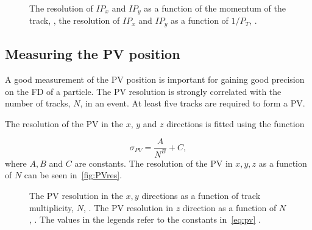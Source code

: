 \begin{figure}
  \centering
  \caption{The resolution of $IP_{x}$ and $IP_{y}$ as a function of the momentum of the track, \protect{}, the resolution of $IP_{x}$ and $IP_{y}$ as a function of $1/P_{T}$, \protect{} \cite{LHCb-DP-2014-001}.}
  \label{fig:IP}
\end{figure}

\subsection{Measuring the PV position}
A good measurement of the PV position is important for gaining good precision on the FD of a particle. The PV resolution is strongly correlated with the number of tracks, $N$, in an event. At least five tracks are required to form a PV. %

The resolution of the PV in the $x$, $y$ and $z$ directions is fitted using the function

\begin{equation}
  \sigma_{PV} = \frac{A}{N^{B}} + C,
  \label{eq:pv}
\end{equation}
where $A, B$ and $C$ are constants. The resolution of the PV in $x,y,z$ as a function of $N$ can be seen in~\autoref{fig:PVres}.
\begin{figure}
  \centering
  \caption{The PV resolution in the $x,y$ directions as a function of track multiplicity, $N$, \protect{}. The PV resolution in $z$ direction as a function of $N$, \protect{}. The values in the legends refer to the constants in~\autoref{eq:pv} \cite{LHCb-DP-2014-001}.
  }
  \label{fig:PVres}
\end{figure}

